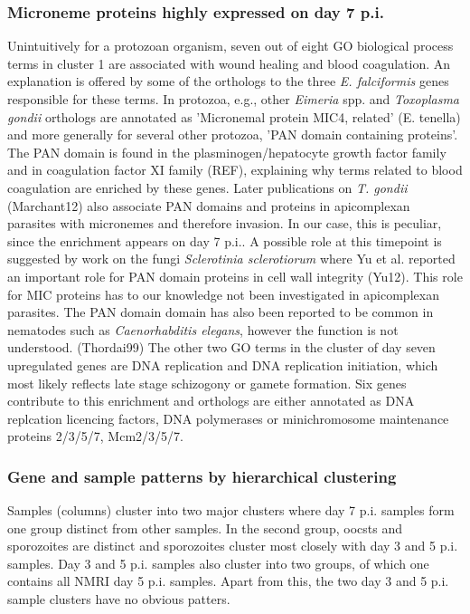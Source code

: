 \documentclass{bmcart}
\begin{document}
\subsubsection*{Microneme proteins highly expressed on day 7 p.i.}
Unintuitively for a protozoan organism, seven out of eight GO biological process terms
in cluster 1 are associated with wound healing and blood coagulation.
An explanation is offered by some of the orthologs to the three \textit{E. falciformis} genes
responsible for these terms. In protozoa, e.g., other \textit{Eimeria} spp. and 
\textit{Toxoplasma gondii} orthologs are annotated as 'Micronemal protein MIC4,
related' (E. tenella) and more generally for several other protozoa, 'PAN domain containing proteins'.
The PAN domain is found in the plasminogen/hepatocyte growth factor family and in coagulation 
factor XI family (REF), explaining why terms related to blood coagulation are enriched by these genes.
Later publications on \textit{T. gondii} (Marchant12) also associate PAN domains and proteins in 
apicomplexan parasites with micronemes and therefore invasion. In our case, this is peculiar, since 
the enrichment appears on day 7 p.i.. A possible role at this timepoint is suggested by work on 
the fungi \textit{Sclerotinia sclerotiorum} where Yu et al. reported an important role for PAN domain
proteins in cell wall integrity (Yu12). This role for MIC proteins has to our knowledge 
not been investigated in apicomplexan parasites. 
The PAN domain domain has also been reported to be common in nematodes such as 
\textit{Caenorhabditis elegans}, however the function is not understood. (Thordai99)
The other two GO terms in the cluster of day seven upregulated genes are DNA replication and DNA 
replication initiation, which most likely reflects late stage schizogony or gamete formation.
Six genes contribute to this enrichment and orthologs are either annotated as DNA replcation
licencing factors, DNA polymerases or minichromosome maintenance proteins 2/3/5/7, Mcm2/3/5/7.


\subsubsection*{Gene and sample patterns by hierarchical clustering}
Samples (columns) cluster into two major clusters where day 7 p.i. samples form one group distinct from
other samples. In the second group, oocsts and sporozoites are distinct and sporozoites cluster
most closely with day 3 and 5 p.i. samples. Day 3 and 5 p.i. samples also cluster into two groups,
of which one contains all NMRI day 5 p.i. samples. Apart from this, the two day 3 and 5 p.i. sample
clusters have no obvious patters. 
\end{document}
